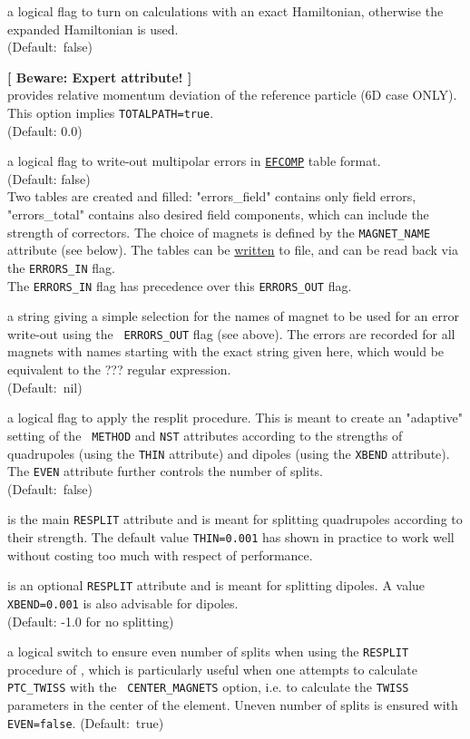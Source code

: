 \begin{madlist}
   a logical flag to turn on calculations with an exact
  Hamiltonian, otherwise the expanded Hamiltonian is used. \\
  (Default:~false)

   {\bf [ Beware: Expert attribute! ]}\\
  provides relative momentum deviation of the reference particle (6D case
  ONLY). This option implies {\tt TOTALPATH=true}. \\
  (Default: 0.0)
  
   a logical flag to write-out multipolar errors
  in \hyperref[sec:efcomp]{\tt EFCOMP} table format. 
  \\ (Default: false) \\
  Two tables are created and filled: "errors\_field" contains only
  field errors, "errors\_total" contains also desired field
  components, which can include the strength of correctors.  
  The choice of magnets is defined by the {\tt MAGNET\_NAME}
  attribute (see below). 
  The tables can be \hyperref[sec:write]{written} to file, and can be
  read back via the {\tt ERRORS\_IN} flag.\\ 
  The {\tt ERRORS\_IN} flag has precedence over this {\tt ERRORS\_OUT} flag.

   a string giving a simple selection for the
  names of magnet to be used for an error write-out using the {\tt
    ERRORS\_OUT} flag (see above). The errors are recorded for all
  magnets with names starting with the exact string given here, which
  would be equivalent to the ??? regular expression.\\
  (Default:~nil)
  
   a logical flag to apply the \ptc resplit
  procedure. This is meant to create an "adaptive" setting of the {\tt
    METHOD} and {\tt NST} attributes according to the strengths of
  quadrupoles (using the {\tt THIN}  attribute) and dipoles (using the
  {\tt XBEND} attribute). The {\tt EVEN} attribute further controls the
  number of splits.  \\
  (Default:~false)

   is the main {\tt RESPLIT} attribute and is meant for
  splitting quadrupoles according to their strength. The default value
  {\tt THIN=0.001} has shown in practice to work well without costing
  too much with respect of performance.
  
   is an optional {\tt RESPLIT} attribute and is meant for
  splitting dipoles. A value {\tt XBEND=0.001} is also advisable for
  dipoles. \\
  (Default: -1.0 for no splitting)

   a logical switch to ensure even number of splits when
  using the {\tt RESPLIT}  procedure of \ptc, which is particularly
  useful when one attempts to calculate {\tt PTC\_TWISS} with the {\tt
    CENTER\_MAGNETS} option, i.e. to calculate the {\tt TWISS}
  parameters in the center of the element. 
  Uneven number of splits is ensured with {\tt EVEN=false}.  
  (Default:~true)
\end{madlist}

